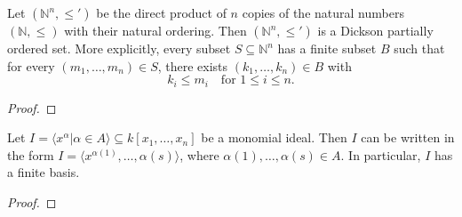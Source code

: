 \begin{theorem}\label{thm:Dickson} %
    \leanok %
    Let $(\mathbb{N}^n, \le')$ be the direct product of $n$ copies of the natural numbers $(\mathbb{N}, \le)$ with their natural ordering. 
    Then $(\mathbb{N}^n, \le')$ is a Dickson partially ordered set. 
    More explicitly, every subset $S \subseteq \mathbb{N}^n$ has a finite subset $B$ such that for every $(m_1, \dots, m_n) \in S$, there exists $(k_1, \dots, k_n) \in B$ with
    \[
    k_i \le m_i \quad \text{for } 1 \le i \le n.
    \]
\end{theorem}
\begin{proof}
  \leanok 
\end{proof}

\begin{theorem}
    \label{thm:Dickson_MvPolynomial}
    \leanok %
    Let $I = \langle x^{\alpha} | \alpha \in A \rangle \subseteq k[x_1, \ldots, x_n]$ be a monomial ideal.
    Then $I$ can be written in the form $I = \langle x^{\alpha(1)}, \ldots , {\alpha(s)} \rangle$, where
    $\alpha(1), \ldots, \alpha(s) \in A$.
    In particular, $I$ has a finite basis.
\end{theorem}
\begin{proof}
  \leanok 
\end{proof}
